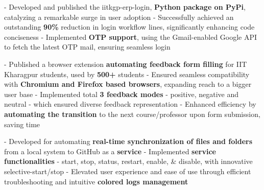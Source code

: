 \documentclass[a4paper,10pt]{extarticle} %
\begin{document}
\begin{description}[style=nextline, font=$\bullet$\hspace{2mm}\normalsize]
\item[{\href{https://github.com/proffapt/iitkgp-erp-login-pypi}{ERP Login Module}} | Python, Gmail API]
- Developed and published the iitkgp-erp-login, \textbf{Python package on PyPi}, catalyzing a remarkable surge in user adoption \newline
- Successfully achieved an outstanding \textbf{90\%} reduction in login workflow lines, significantly enhancing code conciseness \newline
- Implemented \textbf{OTP support}, using the Gmail-enabled Google API to fetch the latest OTP mail, ensuring seamless login

\item[{\href{https://github.com/proffapt/fERP}{fERP}} | HTML, CSS, JavaScript, Web Browser Extension]
- Published a browser extension \textbf{automating feedback form filling} for IIT Kharagpur students, used by \textbf{500+} students \newline
- Ensured seamless compatibility with \textbf{Chromium and Firefox based browsers}, expanding reach to a bigger user base \newline
- Implemented total \textbf{3 feedback modes} - positive, negative and neutral - which ensured diverse feedback representation \newline
- Enhanced efficiency by \textbf{automating the transition} to the next course/professor upon form submission, saving  time 
 

 \item[{\href{https://github.com/proffapt/gsync}{GSYNC}} | Bash, Linux Uitilities] 
- Developed for automating \textbf{real-time synchronization of files and folders} from a local system to GitHub as a \textbf{service} \newline
- Implemented \textbf{service functionalities} - start, stop, status, restart, enable, \& disable, with innovative selective-start/stop \newline
- Elevated user experience and ease of use through efficient troubleshooting and intuitive \textbf{colored logs management}


\end{description}
\end{document}
